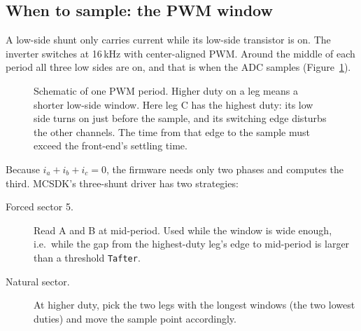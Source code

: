 \documentclass[11pt,a4paper]{article}
\begin{document}
\subsection{When to sample: the PWM window}
\label{sec:sampling}

A low-side shunt only carries current while its low-side transistor is
on. The inverter switches at 16\,kHz with center-aligned PWM. Around the
middle of each period all three low sides are on, and that is when the
ADC samples (Figure~\ref{fig:pwm}).

\begin{figure}[h]
\centering
{}
\caption{Schematic of one PWM period. Higher duty on a leg means a shorter
low-side window. Here leg C has the highest duty: its low side turns on
just before the sample, and its switching edge disturbs the other
channels. The time from that edge to the sample must exceed the
front-end's settling time.}
\label{fig:pwm}
\end{figure}

Because $i_a + i_b + i_c = 0$, the firmware needs only two phases and
computes the third. MCSDK's three-shunt driver has two strategies:
\begin{description}
  \item[Forced sector 5.] Read A and B at mid-period. Used while the
        window is wide enough, i.e.\ while the gap from the highest-duty
        leg's edge to mid-period is larger than a threshold
        \texttt{Tafter}.
  \item[Natural sector.] At higher duty, pick the two legs with the
        longest windows (the two lowest duties) and move the sample
        point accordingly.
\end{description}
\end{document}

